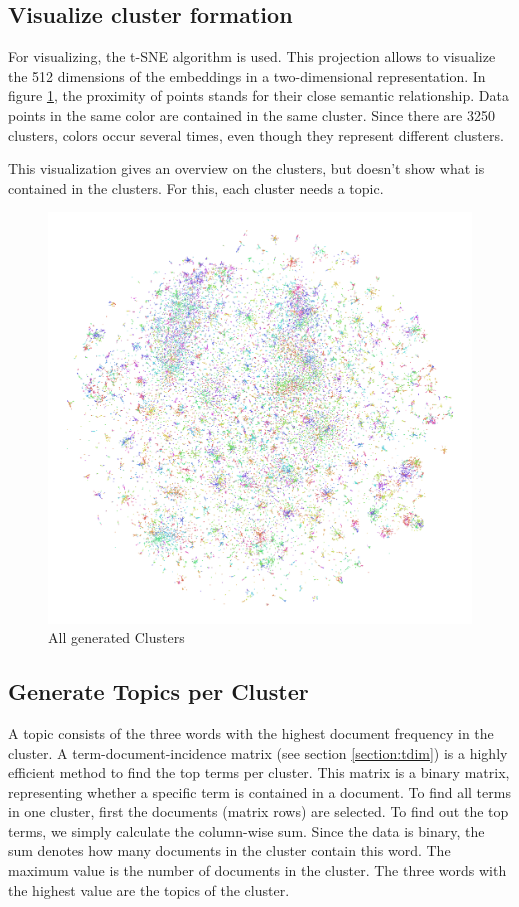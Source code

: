 \subsection{Visualize cluster formation}
For visualizing, the \ac{t-SNE} algorithm is used. This projection allows to visualize the 512 dimensions of the embeddings in a two-dimensional representation. In figure \ref{fig:kmeans}, the proximity of points stands for their close semantic relationship. Data points in the same color are contained in the same cluster. Since there are 3250 clusters, colors occur several times, even though they represent different clusters.

This visualization gives an overview on the clusters, but doesn't show what is contained in the clusters. For this, each cluster needs a topic.

\begin{figure}[!h]
	\centering
	\includegraphics[width=\linewidth]{Bilder/models/minibatchkmeans.pdf}
	\caption{All generated Clusters}
	\label{fig:kmeans}
\end{figure}


\newpage
\subsection{Generate Topics per Cluster}
\label{section:topics}
A topic consists of the three words with the highest document frequency in the cluster. A term-document-incidence matrix (see section \ref{section:tdim}) is a highly efficient method to find the top terms per cluster. This matrix is a binary matrix, representing whether a specific term is contained in a document. To find all terms in one cluster, first the documents (matrix rows) are selected. To find out the top terms, we simply calculate the column-wise sum. Since the data is binary, the sum denotes how many documents in the cluster contain this word. The maximum value is the number of documents in the cluster. The three words with the highest value are the topics of the cluster.

